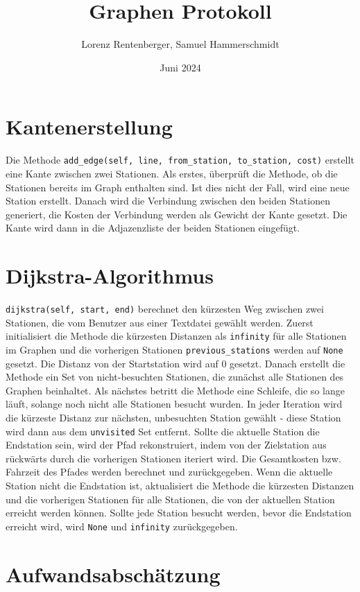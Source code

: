 \documentclass{article}
\title{Graphen Protokoll}
\author{Lorenz Rentenberger, Samuel Hammerschmidt}
\date{Juni 2024}
\begin{document}
\maketitle

\section*{Kantenerstellung}
Die Methode \texttt{add\_edge(self, line, from\_station, to\_station, cost)} erstellt eine Kante zwischen zwei Stationen. Als erstes, überprüft die Methode, ob die Stationen bereits im Graph enthalten sind. Ist dies nicht der Fall, wird eine neue Station erstellt.
Danach wird die Verbindung zwischen den beiden Stationen generiert, die Kosten der Verbindung werden als Gewicht der Kante gesetzt. Die Kante wird dann in die Adjazenzliste der beiden Stationen eingefügt.

\section*{Dijkstra-Algorithmus}
\texttt{dijkstra(self, start, end)} berechnet den kürzesten Weg zwischen zwei Stationen, die vom Benutzer aus einer Textdatei gewählt werden. Zuerst initialisiert die Methode die kürzesten Distanzen als \texttt{infinity} für alle Stationen im Graphen und die vorherigen Stationen \texttt{previous\_stations} werden auf \texttt{None} gesetzt.
Die Distanz von der Startstation wird auf 0 gesetzt. Danach erstellt die Methode ein Set von nicht-besuchten Stationen, die zunächst alle Stationen des Graphen beinhaltet. Als nächstes betritt die Methode eine Schleife, die so lange läuft, solange noch nicht alle Stationen besucht wurden. In jeder Iteration wird die kürzeste Distanz zur nächsten, unbesuchten Station gewählt - diese Station wird dann aus dem \texttt{unvisited} Set entfernt.
Sollte die aktuelle Station die Endstation sein, wird der Pfad rekonstruiert, indem von der Zielstation aus rückwärts durch die vorherigen Stationen iteriert wird. Die Gesamtkosten bzw. Fahrzeit des Pfades werden berechnet und zurückgegeben.
Wenn die aktuelle Station nicht die Endstation ist, aktualisiert die Methode die kürzesten Distanzen und die vorherigen Stationen für alle Stationen, die von der aktuellen Station erreicht werden können. Sollte jede Station besucht werden, bevor die Endstation erreicht wird, wird \texttt{None} und \texttt{infinity} zurückgegeben.

\section*{Aufwandsabschätzung}
\end{document}

